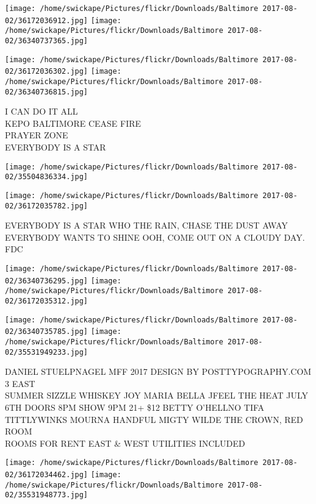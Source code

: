 \documentclass[10pt,letterpaper]{article}
\begin{document}
\texttt{[image: /home/swickape/Pictures/flickr/Downloads/Baltimore 2017-08-02/36172036912.jpg]}
\texttt{[image: /home/swickape/Pictures/flickr/Downloads/Baltimore 2017-08-02/36340737365.jpg]}

\texttt{[image: /home/swickape/Pictures/flickr/Downloads/Baltimore 2017-08-02/36172036302.jpg]}
\texttt{[image: /home/swickape/Pictures/flickr/Downloads/Baltimore 2017-08-02/36340736815.jpg]}

I CAN DO IT ALL\\
KEPO BALTIMORE CEASE FIRE\\
PRAYER ZONE\\
EVERYBODY IS A STAR\\
\pagebreak

\texttt{[image: /home/swickape/Pictures/flickr/Downloads/Baltimore 2017-08-02/35504836334.jpg]}

\vspace{0.25in}
\texttt{[image: /home/swickape/Pictures/flickr/Downloads/Baltimore 2017-08-02/36172035782.jpg]}

EVERYBODY IS A STAR WHO THE RAIN, CHASE THE DUST AWAY EVERYBODY WANTS TO SHINE OOH, COME OUT ON A CLOUDY DAY.\\
FDC\\
\pagebreak

\texttt{[image: /home/swickape/Pictures/flickr/Downloads/Baltimore 2017-08-02/36340736295.jpg]}
\texttt{[image: /home/swickape/Pictures/flickr/Downloads/Baltimore 2017-08-02/36172035312.jpg]}

\texttt{[image: /home/swickape/Pictures/flickr/Downloads/Baltimore 2017-08-02/36340735785.jpg]}
\texttt{[image: /home/swickape/Pictures/flickr/Downloads/Baltimore 2017-08-02/35531949233.jpg]}

DANIEL STUELPNAGEL MFF 2017 DESIGN BY POSTTYPOGRAPHY.COM\\
3 EAST\\
SUMMER SIZZLE WHISKEY JOY MARIA BELLA JFEEL THE HEAT JULY 6TH DOORS 8PM SHOW 9PM 21+ \$12 BETTY O'HELLNO TIFA TITTLYWINKS MOURNA HANDFUL MIGTY WILDE THE CROWN, RED ROOM\\
ROOMS FOR RENT EAST \& WEST UTILITIES INCLUDED\\
\pagebreak

\texttt{[image: /home/swickape/Pictures/flickr/Downloads/Baltimore 2017-08-02/36172034462.jpg]}
\texttt{[image: /home/swickape/Pictures/flickr/Downloads/Baltimore 2017-08-02/35531948773.jpg]}
\end{document}
